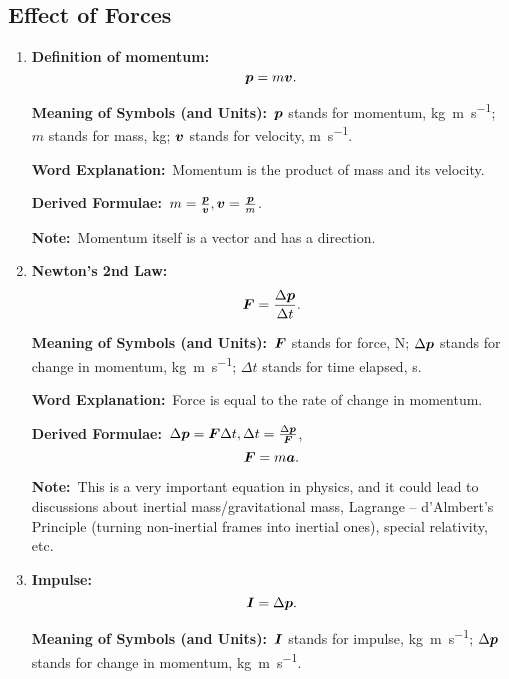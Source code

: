 \documentclass[8pt]{article}
\newcommand{\MeanSymb}{\textbf{Meaning of Symbols (and Units):}\ }
\newcommand{\WordExpl}{\textbf{Word Explanation:}\ }
\newcommand{\DeriForm}{\textbf{Derived Formulae:}\ }
\newcommand{\Note}{\textbf{Note:}\ }
\begin{document}
        \subsection{Effect of Forces}
            \begin{enumerate}
                \item \textbf{Definition of momentum:}
                \[
                    \boldsymbol{p} = m\boldsymbol{v}.
                \]

                \MeanSymb \(\boldsymbol{p}\) stands for momentum, \unit{\kilogram \metre \per \second}; \(m\) stands for mass, \unit{\kilogram}; \(\boldsymbol{v}\) stands for velocity, \unit{\metre\per\second}.

                \WordExpl Momentum is the product of mass and its velocity.

                \DeriForm \(m = \frac{\boldsymbol{p}}{\boldsymbol{v}}, \boldsymbol{v} = \frac{\boldsymbol{p}}{m}\).

                \Note Momentum itself is a vector and has a direction.
                
                \item \textbf{Newton's 2nd Law:}
                \[
                    \boldsymbol{F} = \frac{\Delta \boldsymbol{p}}{\Delta t}.
                \]

                \MeanSymb \(\boldsymbol{F}\) stands for force, \unit{\newton}; \(\Delta \boldsymbol{p}\) stands for change in momentum, \unit{\kilogram \metre \per \second}; \(\Delta t\) stands for time elapsed, \unit{\second}.

                \WordExpl Force is equal to the rate of change in momentum.

                \DeriForm \(\Delta \boldsymbol{p} = \boldsymbol{F} \Delta t, \Delta t = \frac{\Delta \boldsymbol{p}}{\boldsymbol{F}}\),
                \[
                    \boldsymbol{F} = m \boldsymbol{a}.
                \]

                \Note This is a very important equation in physics, and it could lead to discussions about inertial mass/gravitational mass, Lagrange -- d'Almbert's Principle (turning non-inertial frames into inertial ones), special relativity, etc.

                \item \textbf{Impulse:}
                \[
                    \boldsymbol{I} = \Delta \boldsymbol{p}.
                \]

                \MeanSymb \(\boldsymbol{I}\) stands for impulse, \unit{\kilogram \metre \per \second}; \(\Delta \boldsymbol{p}\) stands for change in momentum, \unit{\kilogram \metre \per \second}.


\end{enumerate}
\end{document}
